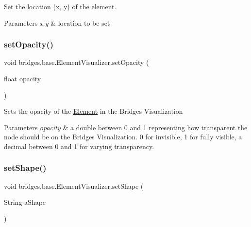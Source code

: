 Set the location (x, y) of the element. 


\begin{DoxyParams}{Parameters}
{\em x,y} & location to be set \\
\hline
\end{DoxyParams}
\mbox{\label{classbridges_1_1base_1_1_element_visualizer_a932f62eb1bd0c92da265a7f903dd0790}} 
\subsubsection{\texorpdfstring{set\+Opacity()}{setOpacity()}}
{\footnotesize\ttfamily void bridges.\+base.\+Element\+Visualizer.\+set\+Opacity (\begin{DoxyParamCaption}\item[{float}]{opacity }\end{DoxyParamCaption})}

Sets the opacity of the \mbox{\hyperlink{classbridges_1_1base_1_1_element}{Element}} in the Bridges Visualization


\begin{DoxyParams}{Parameters}
{\em opacity} & a double between 0 and 1 representing how transparent the node should be on the Bridges Visualization. 0 for invisible, 1 for fully visible, a decimal between 0 and 1 for varying transparency. \\
\hline
\end{DoxyParams}
\mbox{\label{classbridges_1_1base_1_1_element_visualizer_ac3bad991904c8ad23e5233b341381d93}} 
\subsubsection{\texorpdfstring{set\+Shape()}{setShape()}}
{\footnotesize\ttfamily void bridges.\+base.\+Element\+Visualizer.\+set\+Shape (\begin{DoxyParamCaption}\item[{String}]{a\+Shape }\end{DoxyParamCaption})}

